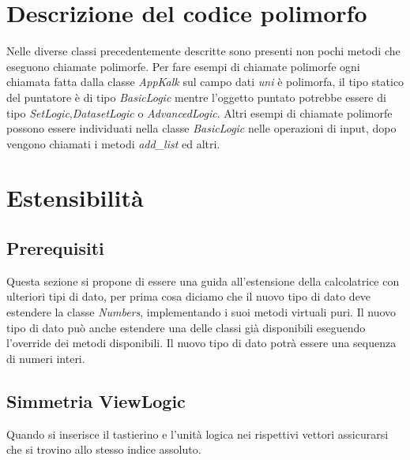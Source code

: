 \documentclass[a4paper,10pt]{article}
\begin{document}
            \section{Descrizione del codice polimorfo}
            Nelle diverse classi precedentemente descritte sono presenti non pochi metodi che eseguono chiamate polimorfe.
            Per fare esempi di chiamate polimorfe ogni chiamata fatta dalla classe \textit{AppKalk} sul campo dati \textit{uni} è polimorfa, il tipo statico del puntatore è di tipo \textit{BasicLogic} mentre l'oggetto puntato potrebbe essere di tipo \textit{SetLogic},\textit{DatasetLogic} o \textit{AdvancedLogic}.
            Altri esempi di chiamate polimorfe possono essere individuati nella classe \textit{BasicLogic} nelle operazioni di input, dopo vengono chiamati i metodi \textit{add\_list} ed altri.
    
            \section{Estensibilità}
            \subsection{Prerequisiti}
            Questa sezione si propone di essere una guida all'estensione della calcolatrice con ulteriori tipi di dato, per prima cosa diciamo che il nuovo tipo di dato deve estendere la classe \textit{Numbers}, implementando i suoi metodi virtuali puri.
            Il nuovo tipo di dato può anche estendere una delle classi già disponibili eseguendo l'override dei metodi disponibili.
            Il nuovo tipo di dato potrà essere una sequenza di numeri interi.
            \subsection{Simmetria View\-Logic}
            Quando si inserisce il tastierino e l'unità logica nei rispettivi vettori assicurarsi che si trovino allo stesso indice assoluto.
\end{document}
